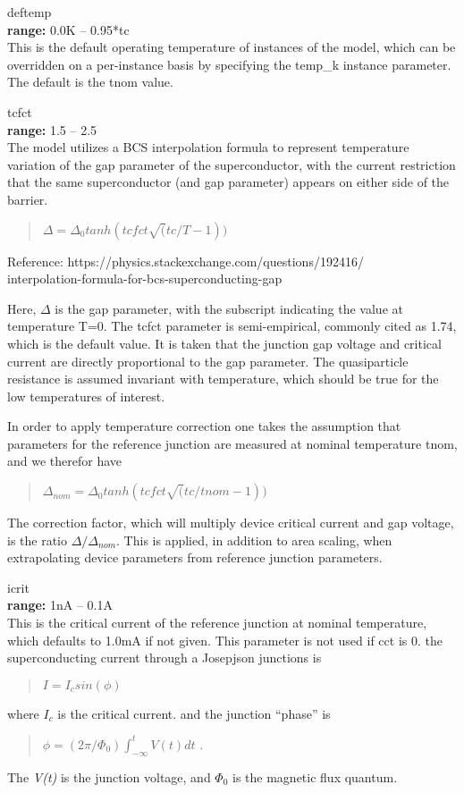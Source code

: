 \begin{description}
\item{\vt deftemp}\\
{\bf range:} 0.0K -- 0.95*{\vt tc}\\
This is the default operating temperature of instances of the model,
which can be overridden on a per-instance basis by specifying the
{\vt temp\_k} instance parameter.  The default is the {\vt tnom}
value.

\item{\vt tcfct}\\
{\bf range:} 1.5 -- 2.5\\
The model utilizes a BCS interpolation formula to represent
temperature variation of the gap parameter of the superconductor, with
the current restriction that the same superconductor (and gap
parameter) appears on either side of the barrier.

\begin{quote}
$\Delta = \Delta_0 tanh(tcfct\sqrt(tc/T-1))$
\end{quote}
Reference: {\vt https://physics.stackexchange.com/questions/192416/\\
interpolation-formula-for-bcs-superconducting-gap}

Here, $\Delta$ is the gap parameter, with the subscript indicating the
value at temperature T=0.  The {\vt tcfct} parameter is
semi-empirical, commonly cited as 1.74, which is the default value. 
It is taken that the junction gap voltage and critical current are
directly proportional to the gap parameter.  The quasiparticle
resistance is assumed invariant with temperature, which should be true
for the low temperatures of interest.

In order to apply temperature correction one takes the assumption that
parameters for the reference junction are measured at nominal
temperature {\vt tnom}, and we therefor have

\begin{quote}
$\Delta_{nom} = \Delta_0 tanh(tcfct\sqrt(tc/tnom-1))$
\end{quote}

The correction factor, which will multiply device critical current and
gap voltage, is the ratio $\Delta/\Delta_{nom}$.  This is applied, in
addition to area scaling, when extrapolating device parameters from
reference junction parameters.

\item{\vt icrit}\\
{\bf range:} 1nA -- 0.1A\\
This is the critical current of the reference junction at nominal
temperature, which defaults to 1.0mA if not given.  This parameter is
not used if {\vt cct} is 0.  the superconducting current through a
Josepjson junctions is
\begin{quote}
$I = I_c sin(\phi)$
\end{quote}
where $I_c$ is the critical current. and the junction ``phase'' is
\begin{quote}
$\phi = (2\pi/\Phi_0)\int^t_{-\infty} V(t)dt$ .
\end{quote}
The {\it V(t)} is the junction voltage, and $\Phi_0$ is the magnetic
flux quantum.


\end{description}
